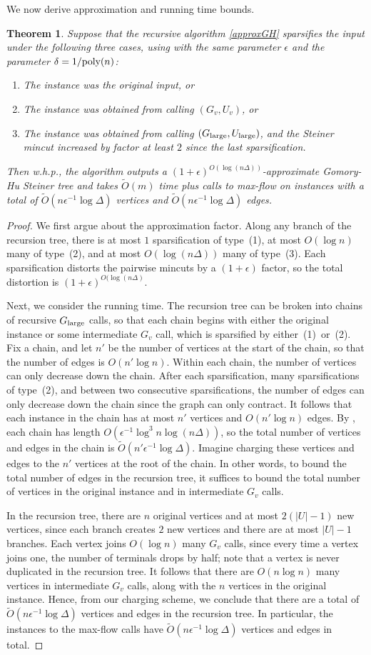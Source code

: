 \documentclass{article}
\newcommand{\BE}{\begin{enumerate}}
\newcommand{\EE}{\end{enumerate}}
\newcommand{\im}{\item}
\newcommand{\logn}{\log n}
\newcommand{\inv}{^{-1}}
\newcommand{\e}{\epsilon}
\newcommand{\de}{\delta}
\newcommand{\De}{\Delta}
\newcommand{\1}{\mathbbm 1}
\newcommand{\poly}{\textup{poly}}
\newtheorem{theorem}{Theorem}
\newcommand{\BT}{\begin{theorem}}
\newcommand{\ET}{\end{theorem}}
\newcommand{\BP}{\begin{proof}}
\newcommand{\EP}{\end{proof}}
\newcommand{\tO}{\tilde{O}}
\newcommand{\thm}[1]{\Cref{thm:#1}}
\newcommand{\lem}[1]{\Cref{lem:#1}}
\newcommand{\lar}{{\textup{large}}}
\begin{document}
We now derive approximation and running time bounds.
\BT
Suppose that the recursive algorithm \ref{approxGH} sparsifies the input under the following three cases, using \thm{sparsify} with the same parameter $\e$ and the parameter $\de=1/\poly(n)$:
 \BE
 \im The instance was the original input, or
 \im The instance was obtained from calling $(G_v,U_v)$, or
 \im The instance was obtained from calling $(G_\lar,U_\lar)$, and the Steiner mincut increased by factor at least $2$ since the last sparsification.
 \EE
Then w.h.p., the algorithm outputs a $(1+\e)^{O(\log(n\De))}$-approximate Gomory-Hu Steiner tree and takes $\tO(m)$ time plus calls to max-flow on instances with a total of $\tO(n\e\inv\log\De)$ vertices and $\tO(n\e\inv\log\De)$ edges.
\ET
\BP
We first argue about the approximation factor. Along any branch of the recursion tree, there is at most $1$ sparsification of type~(1), at most $O(\logn)$ many of type~(2), and at most $O(\log(n\De))$ many of type~(3). Each sparsification distorts the pairwise mincuts by a $(1+\e)$ factor, so the total distortion is $(1+\e)^{O(\log(n\De)}$.

Next, we consider the running time. The recursion tree can be broken into chains of recursive $G_\lar$ calls, so that each chain begins with either the original instance or some intermediate $G_v$ call, which is sparsified by either~(1)~or~(2). Fix a chain, and let $n'$ be the number of vertices at the start of the chain, so that the number of edges is $O(n'\log n)$. Within each chain, the number of vertices can only decrease down the chain. After each sparsification, many sparsifications of type~(2), and between two consecutive sparsifications, the number of edges can only decrease down the chain since the graph can only contract. It follows that each instance in the chain has at most $n'$ vertices and $O(n'\logn)$ edges. By \lem{depth}, each chain has length $O(\e\inv\log^3n\log(n\De))$, so the total number of vertices and edges in the chain is $\tO(n'\e\inv\log\De)$. Imagine charging these vertices and edges to the $n'$ vertices at the root of the chain.
In other words, to bound the total number of edges in the recursion tree, it suffices to bound the total number of vertices in the original instance and in intermediate $G_v$ calls. 

In the recursion tree, there are $n$ original vertices and at most $2(|U|-1)$ new vertices, since each branch creates $2$ new vertices and there are at most $|U|-1$ branches. Each vertex joins $O(\logn)$ many $G_v$ calls, since every time a vertex joins one, the number of terminals drops by half; note that a vertex is never duplicated in the recursion tree. It follows that there are $O(n\logn)$ many vertices in intermediate $G_v$ calls, along with the $n$ vertices in the original instance. Hence, from our charging scheme, we conclude that there are a total of $\tO(n\e\inv\log\De)$ vertices and edges in the recursion tree. In particular, the instances to the max-flow calls have $\tO(n\e\inv\log\De)$ vertices and edges in total.
\EP
\end{document}
